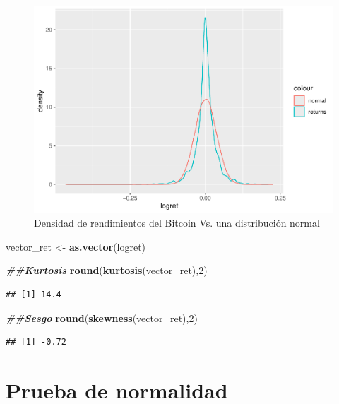 \documentclass[
]{book}
\newenvironment{Shaded}{\begin{snugshade}}{\end{snugshade}}
\newcommand{\DecValTok}[1]{\textcolor[rgb]{0.00,0.00,0.81}{#1}}
\newcommand{\DocumentationTok}[1]{\textcolor[rgb]{0.56,0.35,0.01}{\textbf{\textit{#1}}}}
\newcommand{\FunctionTok}[1]{\textcolor[rgb]{0.13,0.29,0.53}{\textbf{#1}}}
\newcommand{\NormalTok}[1]{#1}
\newcommand{\OtherTok}[1]{\textcolor[rgb]{0.56,0.35,0.01}{#1}}
\begin{document}
\begin{figure}

{\centering \includegraphics{Notas-Series-Tiempo_files/figure-latex/fig104-1} 

}

\caption{Densidad de rendimientos del Bitcoin Vs. una distribución normal}\label{fig:fig104}
\end{figure}

\begin{Shaded}
\begin{Highlighting}[]
\NormalTok{vector\_ret }\OtherTok{\textless{}{-}} \FunctionTok{as.vector}\NormalTok{(logret)}

\DocumentationTok{\#\#Kurtosis}
\FunctionTok{round}\NormalTok{(}\FunctionTok{kurtosis}\NormalTok{(vector\_ret),}\DecValTok{2}\NormalTok{)}
\end{Highlighting}
\end{Shaded}

\begin{verbatim}
## [1] 14.4
\end{verbatim}

\begin{Shaded}
\begin{Highlighting}[]
\DocumentationTok{\#\#Sesgo}
\FunctionTok{round}\NormalTok{(}\FunctionTok{skewness}\NormalTok{(vector\_ret),}\DecValTok{2}\NormalTok{)}
\end{Highlighting}
\end{Shaded}

\begin{verbatim}
## [1] -0.72
\end{verbatim}

\hypertarget{prueba-de-normalidad}{%
\section{Prueba de normalidad}\label{prueba-de-normalidad}}
\end{document}
